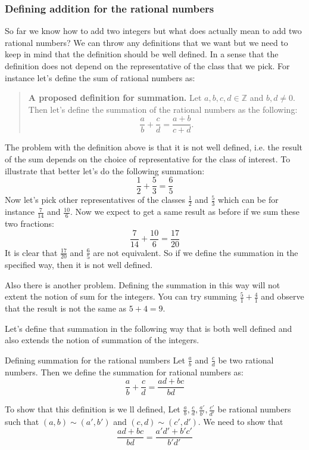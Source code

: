 \subsubsection{Defining addition for the rational numbers}
So far we know how to add two integers but what does actually mean to add two rational numbers? We can throw any definitions that we want but we need to keep in mind that the definition should be well defined. In a sense that the definition does not depend on the representative of the class that we pick. For instance let's define the sum of rational numbers as:

\begin{quote}
	\textbf{A proposed definition for summation.} Let $ a,b,c,d \in \mathbb{Z} $ and $ b,d \neq 0 $. Then let's define the summation of the rational numbers as the following:
	\[ \frac{a}{b} + \frac{c}{d} = \frac{a+b}{c+d}.  \]
\end{quote}

The problem with the definition above is that it is not well defined, i.e. the result of the sum depends on the choice of representative for the class of interest. To illustrate that better let's do the following summation:
\[ \frac{1}{2} + \frac{5}{3} = \frac{6}{5} \]
Now let's pick other representatives of the classes $ \frac{1}{2} $ and $ \frac{5}{3} $ which can be for instance $ \frac{7}{14} $ and $ \frac{10}{6} $. Now we expect to get a same result as before if we sum these two fractions:
\[ \frac{7}{14} + \frac{10}{6} = \frac{17}{20}  \]
It is clear that $ \frac{17}{20} $ and $ \frac{6}{5} $ are not equivalent. So if we define the summation in the specified way, then it is not well defined. 

Also there is another problem. Defining the summation in this way will not extent the notion of sum for the integers. You can try summing $ \frac{5}{1} + \frac{4}{1} $ and observe that the result is not the same as $ 5+4=9 $.

Let's define that summation in the following way that is both well defined and also extends the notion of summation of the integers. 

\begin{defbox}{Defining summation for the rational numbers}
	Let $ \frac{a}{b} $ and $ \frac{c}{d} $ be two rational numbers. Then we define the summation for rational numbers as:
	\[ \frac{a}{b} + \frac{c}{d} = \frac{ad + bc}{bd} \]
\end{defbox}

To show that this definition is we ll defined, Let $ \frac{a}{b},\frac{c}{d},\frac{a'}{b'},\frac{c'}{d'} $ be rational numbers such that $ (a,b) \sim (a',b') $ and $ (c,d) \sim (c', d') $. We need to show that
 \[ \frac{ad+bc}{bd} = \frac{a'd' + b'c'}{b'd'} \]
 
